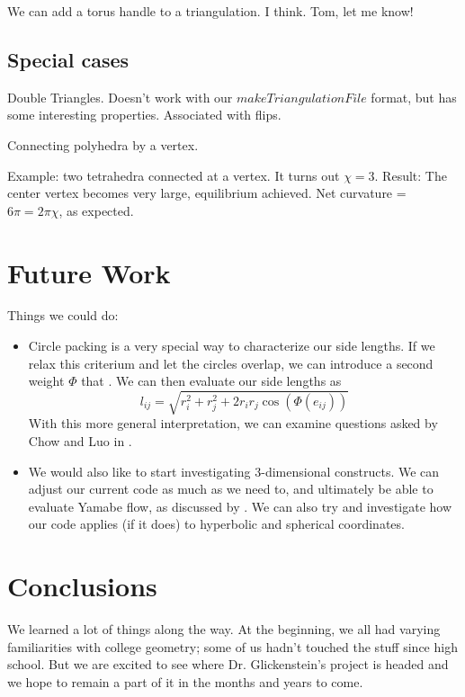 \documentclass[12pt]{article}
\begin{document}
We can add a torus handle to a triangulation. I think. Tom, let me know!

\subsection{Special cases}
\maketitle

Double Triangles. Doesn't work with our $makeTriangulationFile$ format, but has some interesting properties. Associated with flips.\newline

Connecting polyhedra by a vertex. \newline

Example: two tetrahedra connected at a vertex. It turns out $\chi = 3$. 
Result: The center vertex becomes very large, equilibrium achieved. Net curvature = $6\pi = 2\pi\chi$, as expected. 

\newpage
\section{Future Work}
\maketitle
  Things we could do:
  \begin{itemize}

  \item Circle packing is a very special way to characterize our side lengths. If we relax this criterium and let the circles overlap, we can introduce a second weight $\Phi$ that . We can then evaluate our side lengths as $$l_{ij} = \sqrt{r_i^2 + r_j^2 + 2r_ir_j\cos(\Phi(e_{ij}))}$$ With this more general interpretation, we can examine questions asked by Chow and Luo in \cite{chowluo}.  
  
  \item We would also like to start investigating 3-dimensional constructs. We can adjust our current code as much as we need to, and ultimately be able to evaluate Yamabe flow, as discussed by \cite{DrG}. We can also try and investigate how our code applies (if it does) to hyperbolic and spherical coordinates. 
  \end{itemize} 
  
  \newpage
  \section{Conclusions}
  We learned a lot of things along the way. At the beginning, we all had varying familiarities with college geometry; some of us hadn't touched the stuff since high school. But we are excited to see where Dr. Glickenstein's project is headed and we hope to remain a part of it in the months and years to come.\newline
  
\end{document}
